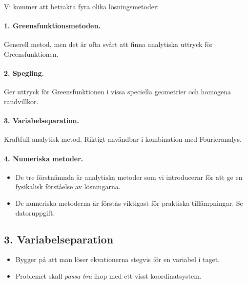 \documentclass[%
oneside,                 %
final,                   %
10pt]{article}
\newenvironment{summary_mdfboxadmon}[1][]{
\begin{summary_mdfboxmdframed}[frametitle=#1]
}
{
\end{summary_mdfboxmdframed}
}
\begin{document}
\begin{summary_mdfboxadmon}
Vi kommer att betrakta fyra olika lösningsmetoder:

\paragraph{1. Greensfunktionsmetoden.}
Generell metod, men det är ofta svårt att finna analytiska uttryck för Greensfunktionen.
\paragraph{2. Spegling.}
Ger uttryck för Greensfunktionen i vissa speciella geometrier och homogena randvillkor.
\paragraph{3. Variabelseparation.}
Kraftfull analytisk metod. Riktigt användbar i kombination med Fourieranalys.
\paragraph{4. Numeriska metoder.}
\begin{itemize}
\item De tre förstnämnda är analytiska metoder som vi introducerar för att ge en fysikalisk förståelse av lösningarna.

\item De numeriska metoderna är förstås viktigast för praktiska tillämpningar. Se datoruppgift.
\end{itemize}

\noindent
\end{summary_mdfboxadmon} %



\subsection*{3. Variabelseparation}

\begin{itemize}
\item Bygger på att man löser ekvationerna stegvis för en variabel i taget. 

\item Problemet skall \emph{passa bra} ihop med ett visst koordinatsystem.
\end{itemize}

\noindent
\end{document}
